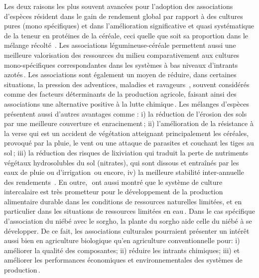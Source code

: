 \documentclass[a4paper,11pt]{article}
\begin{document}
Les deux raisons les plus souvent avancées pour l’adoption des
associations d’espèces résident dans le gain de rendement global par
rapport à des cultures pures (mono spécifiques) et dans l’amélioration
significative et quasi systématique de la teneur en protéines de la
céréale, ceci quelle que soit sa proportion dans le mélange récolté
\,\cite{Jensen_1996}. Les associations légumineuse-céréale permettent
aussi une meilleure valorisation des ressources du milieu
comparativement aux cultures mono-spécifiques correspondantes dans les
systèmes à bas niveaux d’intrants azotés\,\cite{Bedoussac_2010}. Les
associations sont également un moyen de réduire, dans certaines
situations, la pression des adventices, maladies et ravageurs
\,\cite{Altieri_1999}, souvent considérés comme des facteurs
déterminants de la production agricole, faisant ainsi des associations
une alternative positive à la lutte
chimique\,\cite{Hauggaard_2001}. Les mélanges d’espèces présentent
aussi d’autres avantages comme : i) la réduction de l’érosion des sols
par une meilleure couverture et enracinement\,\cite{Zougmore_1998};
ii) l’amélioration de la résistance à la verse qui est un accident de
végétation atteignant principalement les céréales, provoqué par la
pluie, le vent ou une attaque de parasites et couchant les tiges au
sol\,\cite{Anil_1998}; iii) la réduction des risques de lixiviation
qui traduit la perte de nutriments végétaux hydrosolubles
du sol (nitrates), qui sont dissous et entraînés par les eaux de pluie ou
d’irrigation\,\cite{CorreHellou_2005} ou encore, iv) la meilleure
stabilité inter-annuelle des rendements \,\cite{Lithourgidis_2006}. En
outre,\,\citeauthor{Chu_2004}\,\citeyear{Chu_2004} ont aussi montré
que le système de culture intercalaire est très prometteur pour le
développement de la production alimentaire durable dans les conditions
de ressources naturelles limitées, et en particulier dans les
situations de ressources limitées en eau\,\cite{Tsubo_2005}. Dans le
cas spécifique d’association du niébé avec le sorgho, la plante du
sorgho aide celle du niébé à se développer. De ce fait, les
associations culturales pourraient présenter un intérêt aussi bien en
agriculture biologique qu’en agriculture conventionnelle pour: i)
améliorer la qualité des composantes; ii) réduire les intrants
chimiques; iii) et améliorer les performances économiques et
environnementales des systèmes de
production\,\cite{Koulibi_FideleZONGO}.
 
\end{document}

